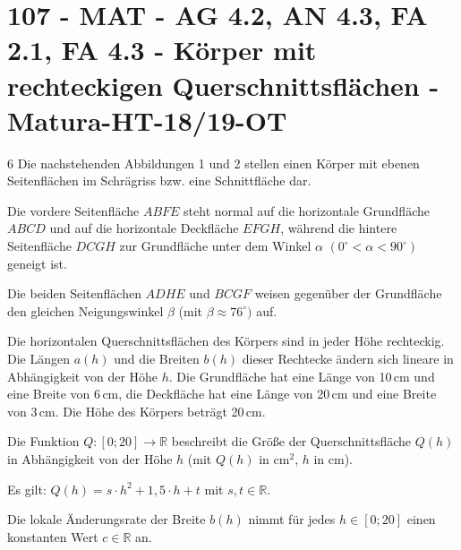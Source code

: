 \section{107 - MAT - AG 4.2, AN 4.3, FA 2.1, FA 4.3 - Körper mit rechteckigen Querschnittsflächen - Matura-HT-18/19-OT}

\begin{langesbeispiel} \item[6] %
Die nachstehenden Abbildungen 1 und 2 stellen einen Körper mit ebenen Seitenflächen im Schrägriss bzw. eine Schnittfläche dar.
		\begin{center}
		\end{center}

Die vordere Seitenfläche $ABFE$ steht normal auf die horizontale Grundfläche $ABCD$ und auf die horizontale Deckfläche $EFGH$, während die hintere Seitenfläche $DCGH$ zur Grundfläche unter dem Winkel $\alpha$ $(0^\circ<\alpha<90^\circ)$ geneigt ist.

Die beiden Seitenflächen $ADHE$ und $BCGF$ weisen gegenüber der Grundfläche den gleichen Neigungswinkel $\beta$ (mit $\beta\approx 76^\circ)$ auf.

Die horizontalen Querschnittsflächen des Körpers sind in jeder Höhe rechteckig. Die Längen $a(h)$ und die Breiten $b(h)$ dieser Rechtecke ändern sich lineare in Abhängigkeit von der Höhe $h$. Die Grundfläche hat eine Länge von 10\,cm und eine Breite von 6\,cm, die Deckfläche hat eine Länge von 20\,cm und eine Breite von 3\,cm. Die Höhe des Körpers beträgt 20\,cm.%

\begin{aufgabenstellung}
\item Die Funktion $Q\!:[0;20]\rightarrow\mathbb{R}$ beschreibt die Größe der Querschnittsfläche $Q(h)$ in Abhängigkeit von der Höhe $h$ (mit $Q(h)$ in cm$^2$, $h$ in cm).
	
	Es gilt: $Q(h)=s\cdot h^2+1,5\cdot h+t$ mit $s,t\in\mathbb{R}$.%


\item Die lokale Änderungsrate der Breite $b(h)$ nimmt für jedes $h\in[0;20]$ einen konstanten Wert $c\in\mathbb{R}$ an.%



\end{aufgabenstellung}
\end{langesbeispiel}
